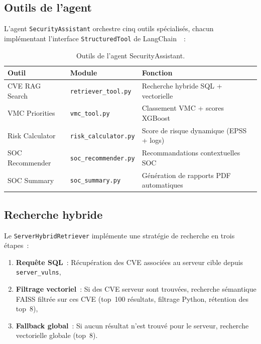 \documentclass[runningheads]{llncs}
\begin{document}
\subsection{Outils de l'agent}

L'agent \texttt{SecurityAssistant} orchestre cinq outils spécialisés, chacun implémentant l'interface \texttt{StructuredTool} de LangChain~\cite{langchain2023}~:

\begin{table}[H]
\centering
\footnotesize
\begin{tabular}{l p{3cm} p{5.5cm}}
\toprule
\textbf{Outil} & \textbf{Module} & \textbf{Fonction} \\
\midrule
CVE RAG Search & \texttt{retriever\_tool.py} & Recherche hybride SQL + vectorielle \\
VMC Priorities & \texttt{vmc\_tool.py} & Classement VMC + scores XGBoost \\
Risk Calculator & \texttt{risk\_calculator.py} & Score de risque dynamique (EPSS + logs) \\
SOC Recommender & \texttt{soc\_recommender.py} & Recommandations contextuelles SOC \\
SOC Summary & \texttt{soc\_summary.py} & Génération de rapports PDF automatiques \\
\bottomrule
\end{tabular}
\caption{Outils de l'agent SecurityAssistant.}
\label{tab:tools}
\end{table}

\subsection{Recherche hybride}

Le \texttt{ServerHybridRetriever} implémente une stratégie de recherche en trois étapes~:

\begin{enumerate}[nosep]
    \item \textbf{Requête SQL}~: Récupération des CVE associées au serveur cible depuis \texttt{server\_vulns},
    \item \textbf{Filtrage vectoriel}~: Si des CVE serveur sont trouvées, recherche sémantique FAISS filtrée sur ces CVE (top~100 résultats, filtrage Python, rétention des top~8),
    \item \textbf{Fallback global}~: Si aucun résultat n'est trouvé pour le serveur, recherche vectorielle globale (top~8).
\end{enumerate}
\end{document}
